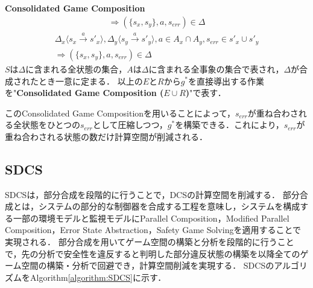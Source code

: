 \begin{dfn}{\textbf{Consolidated Game Composition}}
\begin{multline}
    \Rightarrow (\{ s_{x},s_{y} \},a,s_{err}) \in \Delta
    \end{multline}
    \begin{multline}
    \label{formula:cgs6}
    \Delta_x \langle s_{x} \overset{a}{\rightarrow} s'_{x} \rangle, \Delta_y \langle s_{y} \overset{a}{\rightarrow} s'_{y} \rangle, a \in A_{x} \cap A_{y}, s_{err} \in s'_{x} \cup s'_{y}\\
    \Rightarrow (\{ s_{x},s_{y} \},a,s_{err}) \in \Delta
    \end{multline}
    $S$は$\Delta$に含まれる全状態の集合，$A$は$\Delta$に含まれる全事象の集合で表され，$\Delta$が合成されたとき一意に定まる．
    以上の$E$と$R$から$g^*$を直接導出する作業を"{\bf Consolidated Game Composition ($E \cup R$)}"で表す．
\end{dfn}

このConsolidated Game Compositionを用いることによって，$s_{err}$が重ね合わされる全状態をひとつの$s_{err}$として圧縮しつつ，$g^*$を構築できる．これにより，$s_{err}$が重ね合わされる状態の数だけ計算空間が削減される．



\subsection{SDCS}
\label{subsection:SDCS}
SDCS\cite{yamauchi:IEICEJ2023}は，部分合成を段階的に行うことで，DCSの計算空間を削減する．
部分合成とは，システムの部分的な制御器を合成する工程を意味し，システムを構成する一部の環境モデルと監視モデルにParallel Composition，Modified Parallel Composition，Error State Abstraction，Safety Game Solvingを適用することで実現される．
部分合成を用いてゲーム空間の構築と分析を段階的に行うことで，先の分析で安全性を違反すると判明した部分違反状態の構築を以降全てのゲーム空間の構築・分析で回避でき，計算空間削減を実現する．
SDCSのアルゴリズムをAlgorithm\ref{algorithm:SDCS}に示す．

